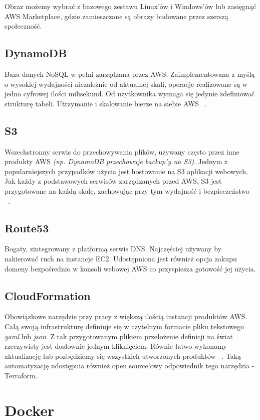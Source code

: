 Obraz możemy wybrać z bazowego zestawu Linux'ów i Windows'ów lub zasięgnąć AWS Marketplace, gdzie zamieszczane są obrazy budowane przez szerszą społeczność.

\subsection{DynamoDB}
Baza danych NoSQL w pełni zarządzana przez AWS. 
Zaimplementowana z myślą o wysokiej wydajności niezależnie od aktualnej skali, operacje realizowane są w jedno cyfrowej ilości milisekund.
Od użytkownika wymaga się jedynie zdefiniować strukturę tabeli. Utrzymanie i skalowanie bierze na siebie AWS ~\cite{AWS-O}.

\subsection{S3}
Wszechstronny serwis do przechowywania plików, używany często przez inne produkty AWS {\em (np. DynamoDB przechowuje backup'y na S3)}. 
Jednym z popularniejszych przypadków użycia jest hostowanie na S3 aplikacji webowych. 
Jak każdy z podstawowych serwisów zarządzanych przed AWS, S3 jest przygotowane na każdą skalę, zachowując przy tym wydajność i bezpieczeństwo ~\cite{AWS-O}.

\subsection{Route53}
Bogaty, zintegrowany z platformą serwis DNS. Najczęściej używany by nakierować ruch na instancje EC2. 
Udostępniona jest również opcja zakupu domeny bezpośrednio w konsoli webowej AWS co przyspiesza gotowość jej użycia.

\subsection{CloudFormation} \label{cloudFormation}
Obowiązkowe narzędzie przy pracy z większą ilością instancji produktów AWS. 
Całą swoją infrastrukturę definiuje się w czytelnym formacie pliku tekstowego {\em yaml} lub {\em json}.
Z tak przygotowanym plikiem przełożenie definicji na świat rzeczywisty jest dosłownie jednym kliknięciem. 
Równie łatwo wykonamy aktualizację lub pozbędziemy się wszystkich utworzonych produktów ~\cite{AWS-O}.
Taką automatyzację udostępnia również open source'owy odpowiednik tego narzędzia - Terraform.


\section{Docker}

